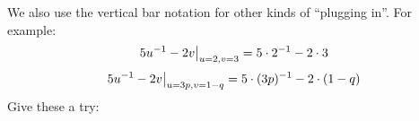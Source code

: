 \newpage

We also use the vertical bar notation for other kinds of ``plugging in''.
For example:
\begin{equation*}
 \left.5u^{-1} - 2v\right|_{u = 2, v = 3} = 5 \cdot 2^{-1} - 2 \cdot 3
\end{equation*}
\begin{equation*}
 \left.5u^{-1} - 2v\right|_{u = 3p, v = 1-q} = 5 \cdot (3p)^{-1} - 2 \cdot (1-q)
\end{equation*}
Give these a try:

\begin{multicols}{2}
 \large
 \begin{ProblemSet}[pencil space=1.5in]
 \end{ProblemSet}
\end{multicols}

\newpage

